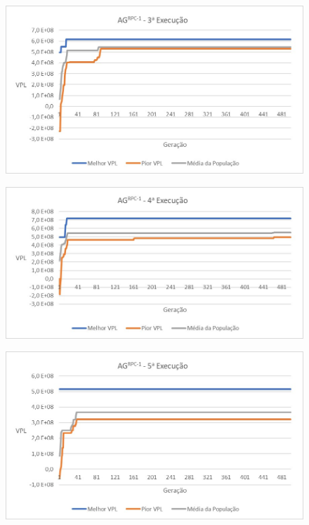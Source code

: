 \documentclass[12pt,a4paper]{report}
\begin{document}
\begin{figure}[H]
\centering

\includegraphics[scale=1]{ApA/AGRPC/3}
\end{figure}

\begin{figure}[H]
\centering

\includegraphics[scale=1]{ApA/AGRPC/4}
\end{figure}

\begin{figure}[H]
\centering

\includegraphics[scale=1]{ApA/AGRPC/5}
\end{figure}
\end{document}
